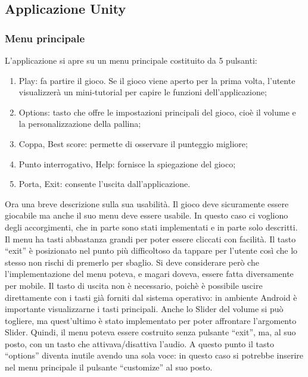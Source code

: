 \subsection{Applicazione Unity}
\subsubsection{Menu principale}
L’applicazione si apre su un menu principale costituito da 5 pulsanti:
\begin{enumerate}
\item Play: fa partire il gioco. Se il gioco viene aperto per la prima volta, l’utente visualizzerà un mini-tutorial per capire le funzioni dell’applicazione;
\item Options: tasto che offre le impostazioni principali del gioco, cioè il volume e la personalizzazione della pallina;
\item Coppa, Best score: permette di osservare il punteggio migliore;
\item Punto interrogativo, Help: fornisce la spiegazione del gioco;
\item Porta, Exit: consente l’uscita dall’applicazione.
\end{enumerate}
Ora una breve descrizione sulla sua usabilità. Il gioco deve sicuramente essere giocabile ma anche il suo menu deve essere usabile. In questo caso ci vogliono degli accorgimenti, che in parte sono stati implementati e in parte solo descritti. Il menu ha tasti abbastanza grandi per poter essere cliccati con facilità. Il tasto “exit” è posizionato nel punto più difficoltoso da tappare per l’utente così che lo stesso non rischi di premerlo per sbaglio. Si deve considerare però che l’implementazione del menu poteva, e magari doveva, essere fatta diversamente per mobile. Il tasto di uscita non è necessario, poichè è possibile uscire direttamente con i tasti già forniti dal sistema operativo: in ambiente Android è importante visualizzarne i tasti principali. Anche lo Slider del volume si può togliere, ma quest’ultimo è stato implementato per poter affrontare l’argomento Slider. Quindi, il menu poteva essere costruito senza pulsante “exit”, ma, al suo posto, con un tasto che attivava/disattiva l’audio. A questo punto il tasto “options” diventa inutile avendo una sola voce: in questo caso si potrebbe inserire nel menu principale il pulsante “customize” al suo posto.
 
